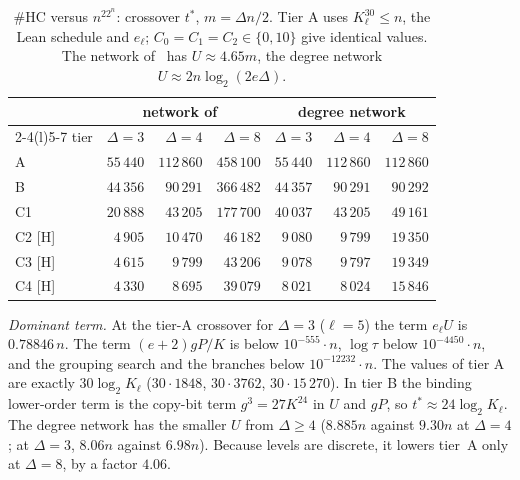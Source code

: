 \documentclass[10pt]{amsart}
\theoremstyle{definition}
\theoremstyle{remark}
\numberwithin{equation}{section}
\newcommand{\HC}{\#\mathrm{HC}}
\newcommand{\tst}{t^{*}}
\newcommand{\Hh}{\textup{[H]}}
\begin{document}
\begin{table}[ht]
\centering\small
\caption{$\HC$ versus $n^22^n$: crossover $\tst$, $m=\Delta n/2$. Tier A uses $K_\ell^{30}\le n$, the
Lean schedule and $e_\ell$; $C_0=C_1=C_2\in\{0,10\}$ give identical values. The network
of~\cite{Tulsyan26} has $U\approx4.65m$, the degree network $U\approx2n\log_2(2e\Delta)$.}\label{tab:hc}
\begin{tabular}{@{}lrrrrrr@{}}
\toprule
& \multicolumn{3}{c}{network of~\cite{Tulsyan26}} & \multicolumn{3}{c}{degree network}\\
\cmidrule(lr){2-4}\cmidrule(l){5-7}
tier & $\Delta=3$ & $\Delta=4$ & $\Delta=8$ & $\Delta=3$ & $\Delta=4$ & $\Delta=8$\\
\midrule
A & $55\,440$ & $112\,860$ & $458\,100$ & $55\,440$ & $112\,860$ & $112\,860$\\
B & $44\,356$ & $90\,291$ & $366\,482$ & $44\,357$ & $90\,291$ & $90\,292$\\
C1 & $20\,888$ & $43\,205$ & $177\,700$ & $40\,037$ & $43\,205$ & $49\,161$\\
C2 \Hh & $4\,905$ & $10\,470$ & $46\,182$ & $9\,080$ & $9\,799$ & $19\,350$\\
C3 \Hh & $4\,615$ & $9\,799$ & $43\,206$ & $9\,078$ & $9\,797$ & $19\,349$\\
C4 \Hh & $4\,330$ & $8\,695$ & $39\,079$ & $8\,021$ & $8\,024$ & $15\,846$\\
\bottomrule
\end{tabular}
\end{table}

\emph{Dominant term.} At the tier-A crossover for $\Delta=3$ ($\ell=5$) the term $e_\ell U$ is
$0.78846\,n$. The term $(e+2)gP/K$ is below $10^{-555}\cdot n$, $\log\tau$ below $10^{-4450}\cdot n$,
and the grouping search and the branches below $10^{-12232}\cdot n$. The values of tier A are exactly
$30\log_2K_\ell$ ($30\cdot1848$, $30\cdot3762$, $30\cdot15\,270$). In tier B the binding lower-order
term is the copy-bit term $g^3=27K^{24}$ in $U$ and $gP$, so $\tst\approx24\log_2K_\ell$. The degree
network has the smaller $U$ from $\Delta\ge4$ ($8.885n$ against $9.30n$ at $\Delta=4$; at $\Delta=3$,
$8.06n$ against $6.98n$). Because levels are discrete, it lowers tier~A only at $\Delta=8$, by a
factor $4.06$.
\end{document}
